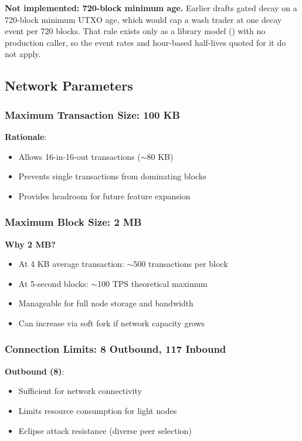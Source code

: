 \textbf{Not implemented: 720-block minimum age.} Earlier drafts gated decay
on a 720-block minimum UTXO age, which would cap a wash trader at one decay
event per 720 blocks. That rule exists only as a library model
() with no production caller, so the
event rates and hour-based half-lives quoted for it do not apply.

\subsection{Network Parameters}

\subsubsection{Maximum Transaction Size: 100 KB}

\textbf{Rationale}:
\begin{itemize}
  \item Allows 16-in-16-out transactions ($\sim$80 KB)
  \item Prevents single transactions from dominating blocks
  \item Provides headroom for future feature expansion
\end{itemize}

\subsubsection{Maximum Block Size: 2 MB}

\textbf{Why 2 MB?}
\begin{itemize}
  \item At 4 KB average transaction: $\sim$500 transactions per block
  \item At 5-second blocks: $\sim$100 TPS theoretical maximum
  \item Manageable for full node storage and bandwidth
  \item Can increase via soft fork if network capacity grows
\end{itemize}

\subsubsection{Connection Limits: 8 Outbound, 117 Inbound}

\textbf{Outbound (8)}:
\begin{itemize}
  \item Sufficient for network connectivity
  \item Limits resource consumption for light nodes
  \item Eclipse attack resistance (diverse peer selection)
\end{itemize}

